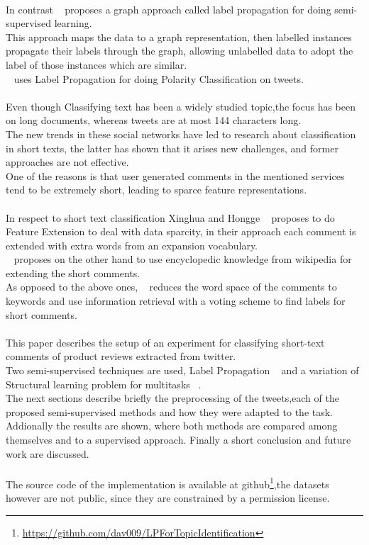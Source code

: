 \documentclass[4pt,a4paper,twocolumn]{article}
\begin{document}
\\
In contrast ~\cite{Zhu:2005:SLG:1104523} proposes a graph approach called label propagation for
doing semi-supervised learning.\\
This approach maps the data to a graph representation, then labelled instances propagate their labels through the graph, allowing unlabelled data to adopt the label of those instances which are similar.\\
~\cite{Speriosu_twitterpolarity} uses Label Propagation for doing Polarity Classification on tweets.\\
\\
Even though Classifying text has been a widely studied topic,the focus has been on long documents,
whereas tweets are at most 144 characters long.\\
The new trends in these social networks have led to research about classification in short texts, the latter has  shown that it arises new challenges, and former approaches are not  effective.\\
One of the reasons is that  user generated comments in the mentioned services tend to be extremely short, leading to sparce feature representations.\\
\\
In respect to short text classification Xinghua and Hongge ~\cite{Fan:2010:NMC:1916732.1917677} proposes  to do Feature Extension to deal with data sparcity, in their approach each comment is extended with extra words from an expansion vocabulary.\\
~\cite{Gabrilovich:2006:OBB:1597348.1597395} proposes on the other hand to use encyclopedic knowledge from wikipedia for extending the short comments.\\
As opposed to the above ones,  ~\cite{Sun:2012:STC:2348283.2348511} reduces the word space of the comments to keywords and use information retrieval with a voting scheme to find labels for short comments.\\
\\
This paper describes the setup of an experiment for classifying short-text comments of product reviews extracted from twitter.\\
Two semi-supervised techniques are used, Label Propagation ~\cite{Zhu:2005:SLG:1104523}  and  a variation of Structural learning problem for multitasks ~\cite{Ando:2005:FLP:1046920.1194905}.\\
The next sections describe briefly  the preprocessing of the tweets,each of the proposed semi-supervised methods and how they were adapted to the task. \\
Addionally the results are shown, where both methods are compared among themselves and to a supervised approach.
Finally a short conclusion and future work are discussed.\\
\\
The source code of the implementation is available at github\footnote{\url{https://github.com/dav009/LPForTopicIdentification}},the datasets however are not public, since they are constrained by a permission license.
\end{document}
